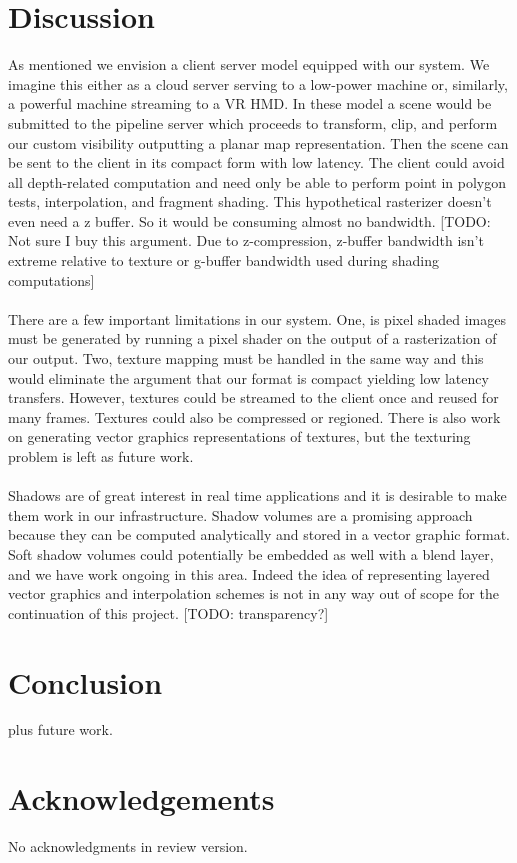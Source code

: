\documentclass[review]{acmsiggraph}
\begin{document}
\section{Discussion}
As mentioned we envision a client server model equipped with our system. We imagine this either as a cloud server serving to a low-power machine or, similarly, a powerful machine streaming to a VR HMD. In these model a scene would be submitted to the pipeline server which proceeds to transform, clip, and perform our custom visibility outputting a planar map representation. Then the scene can be sent to the client in its compact form with low latency. The client could avoid all depth-related computation and need only be able to perform point in polygon tests, interpolation, and fragment shading. This hypothetical rasterizer doesn’t even need a z buffer. So it would be consuming almost no bandwidth. [TODO: Not sure I buy this argument.  Due to z-compression, z-buffer bandwidth isn't extreme relative to texture or g-buffer bandwidth used during shading computations]
\\\\
There are a few important limitations in our system. One, is pixel shaded images must be generated by running a pixel shader on the output of a rasterization of our output. Two, texture mapping must be handled in the same way and this would eliminate the argument that our format is compact yielding low latency transfers. However, textures could be streamed to the client once and reused for many frames.  Textures could also be compressed or regioned. There is also work on generating vector graphics representations of textures, but the texturing problem is left as future work.
\\\\
Shadows are of great interest in real time applications and it is desirable to make them work in our infrastructure. Shadow volumes are a promising approach because they can be computed analytically and stored in a vector graphic format. Soft shadow volumes could potentially be embedded as well with a blend layer, and we have work ongoing in this area. Indeed the idea of representing layered vector graphics and interpolation schemes is not in any way out of scope for the continuation of this project. [TODO: transparency?]

\section{Conclusion}
plus future work.

\section*{Acknowledgements}

No acknowledgments in review version.


\nocite{*}

\end{document}
